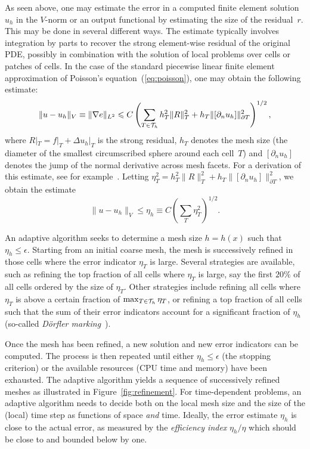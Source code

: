 As seen above, one may estimate the error in a computed finite element
solution~$u_h$ in the $V$-norm or an output functional by estimating
the size of the residual~$r$.  This may be done in several different
ways. The estimate typically involves integration by parts to recover
the strong element-wise residual of the original PDE, possibly in
combination with the solution of local problems over cells or patches
of cells. In the case of the standard piecewise linear finite element
approximation of Poisson's equation~(\ref{eq:poisson}), one may obtain
the following estimate:
\begin{equation}
  \|u - u_h\|_V \equiv \|\nabla e\|_{L^2} \leqslant C
  \left(
  \sum_{T\in\mathcal{T}_h} h_T^2 \|R\|_{T}^2 +
  h_T \|[\partial_n u_h]\|_{\partial T}^2
  \right)^{1/2},
\end{equation}
where $R|_T = f|_T + \Delta u_h|_T$ is the strong residual, $h_T$
denotes the mesh size (the diameter of the smallest circumscribed
sphere around each cell~$T$) and $[\partial_n u_h]$ denotes the jump
of the normal derivative across mesh facets. For a derivation of this
estimate, see for example~\citet{ElmanSilvesterWathen2005}. Letting
$\eta_T^2 = h_T^2 \|R\|_{T}^2 + h_T \|[\partial_n u_h]\|_{\partial
  T}^2$, we obtain the estimate
\begin{equation}
  \|u - u_h\|_V \leqslant \eta_h \equiv C \left( \sum_T \eta_T^2 \right)^{1/2}.
\end{equation}

%
An adaptive algorithm seeks to determine a mesh size $h = h(x)$ such
that $\eta_h \leqslant \epsilon$. Starting from an initial coarse
mesh, the mesh is successively refined in those cells where the error
indicator $\eta_T$ is large. Several strategies are available, such as
refining the top fraction of all cells where $\eta_T$ is large, say
the first $20\%$ of all cells ordered by the size of $\eta_T$. Other strategies
include refining all cells where $\eta_T$ is above a certain fraction
of $\max_{T\in\mathcal{T}_h} \eta_T$, or refining a top fraction of all cells
such that the sum of their error indicators account for a significant
fraction of $\eta_h$ (so-called \emph{D\"orfler
  marking}~\citep{Dorfler1996}).

%
Once the mesh has been refined, a new solution and new error
indicators can be computed. The process is then repeated until either
$\eta_h \leqslant \epsilon$ (the stopping criterion) or the available
resources (CPU time and memory) have been exhausted. The adaptive
algorithm yields a sequence of successively refined meshes as
illustrated in Figure~\ref{fig:refinement}. For time-dependent
problems, an adaptive algorithm needs to decide both on the local mesh
size and the size of the (local) time step as functions of space
\emph{and} time. Ideally, the error estimate $\eta_h$ is close to the
actual error, as measured by the \emph{efficiency index} $\eta_h /
\eta$ which should be close to and bounded below by one.

